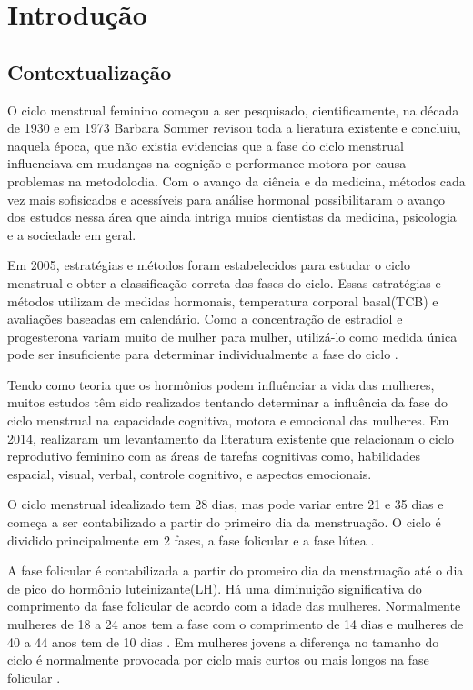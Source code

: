 \chapter[Introdução]{Introdução}

\section{Contextualização}

O ciclo menstrual feminino começou a ser pesquisado, cientificamente, na década de 1930 \cite{frank1931} e em 1973 Barbara Sommer revisou toda a lieratura existente e concluiu, naquela época, que não existia evidencias que a fase do ciclo menstrual influenciava em mudanças na cognição e performance motora por causa problemas na metodolodia. Com o avanço da ciência e da medicina, métodos cada vez mais sofisicados e acessíveis para análise hormonal possibilitaram o avanço dos estudos nessa área que ainda intriga muios cientistas da medicina, psicologia e a sociedade em geral.

Em 2005, estratégias e métodos foram estabelecidos para estudar o ciclo menstrual e obter a classificação correta das fases do ciclo\cite{becker2005}. Essas estratégias e métodos utilizam de medidas hormonais, temperatura corporal basal(TCB) e avaliações baseadas em calendário. Como a concentração de estradiol e progesterona variam muito de mulher para mulher, utilizá-lo como medida única pode ser insuficiente para determinar individualmente a fase do ciclo \cite{poroma2014}.

Tendo como teoria que os hormônios podem influênciar a vida das mulheres, muitos estudos têm sido realizados tentando determinar a influência da fase do ciclo menstrual na capacidade cognitiva, motora e emocional das mulheres. Em 2014,  realizaram um levantamento da literatura existente que relacionam o ciclo reprodutivo feminino com as áreas de tarefas cognitivas como, habilidades espacial, visual, verbal, controle cognitivo, e aspectos emocionais.

O ciclo menstrual idealizado tem 28 dias, mas pode variar entre 21 e 35 dias \cite{lenton1984a} e começa a ser contabilizado a partir do primeiro dia da menstruação. O ciclo é dividido principalmente em 2 fases, a fase folicular e a fase lútea \cite{brondin2008}.

A fase folicular é contabilizada a partir do promeiro dia da menstruação até o dia de pico do hormônio luteinizante(LH). Há uma diminuição significativa do comprimento da fase folicular de acordo com a idade das mulheres. Normalmente mulheres de 18 a 24 anos tem a fase com o comprimento de 14 dias e mulheres de 40 a 44 anos tem de 10 dias \cite{lenton1984a}. Em mulheres jovens a diferença no tamanho do ciclo é normalmente provocada por ciclo mais curtos ou mais longos na fase folicular \cite{lenton1984a}.

